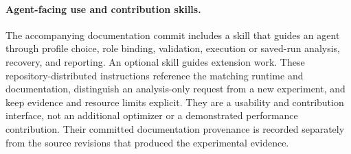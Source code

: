 \paragraph{Agent-facing use and contribution skills.}
The accompanying documentation commit includes a  skill that guides an agent through profile choice, role binding, validation, execution or saved-run analysis, recovery, and reporting. An optional  skill guides extension work. These repository-distributed instructions reference the matching runtime and documentation, distinguish an analysis-only request from a new experiment, and keep evidence and resource limits explicit. They are a usability and contribution interface, not an additional optimizer or a demonstrated performance contribution. Their committed documentation provenance is recorded separately from the source revisions that produced the experimental evidence.
